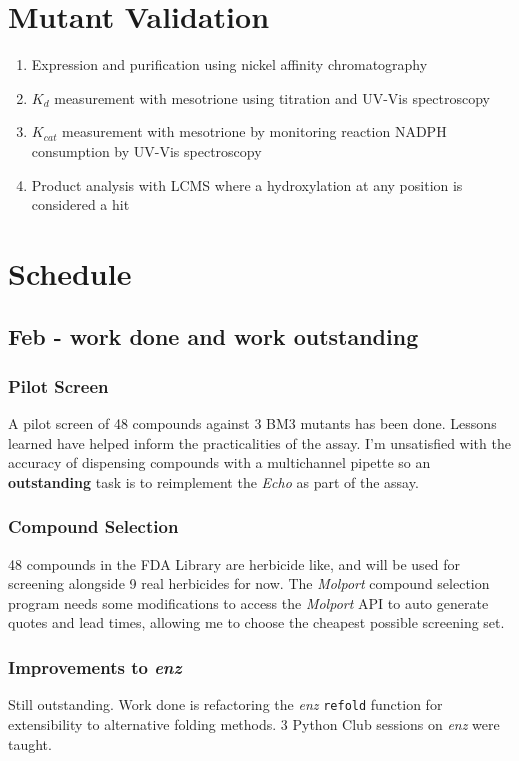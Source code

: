 \documentclass{article}
\begin{document}
\section{Mutant Validation}
\begin{enumerate}
\item Expression and purification using nickel affinity chromatography
\item $K_d$ measurement with mesotrione using titration and UV-Vis spectroscopy
\item $K_{cat}$ measurement with mesotrione by monitoring reaction NADPH consumption by UV-Vis spectroscopy
\item Product analysis with LCMS where a hydroxylation at any position is considered a hit
\end{enumerate}

\section{Schedule}
\subsection{Feb - work done and work outstanding}
\subsubsection{Pilot Screen}
A pilot screen of 48 compounds against 3 BM3 mutants has been done. Lessons learned have helped inform the practicalities of the assay. I'm unsatisfied with the accuracy of dispensing compounds with a multichannel pipette so an \textbf{outstanding} task is to reimplement the \textit{Echo} as part of the assay. 
\subsubsection{Compound Selection}
48 compounds in the FDA Library are herbicide like, and will be used for screening alongside 9 real herbicides for now. The \textit{Molport} compound selection program needs some modifications to access the \textit{Molport} API to auto generate quotes and lead times, allowing me to choose the cheapest possible screening set.
\subsubsection{Improvements to \textit{enz}}
Still outstanding. Work done is refactoring the \textit{enz} \texttt{refold} function for extensibility to alternative folding methods. 3 Python Club sessions on \textit{enz} were taught.
\end{document}
